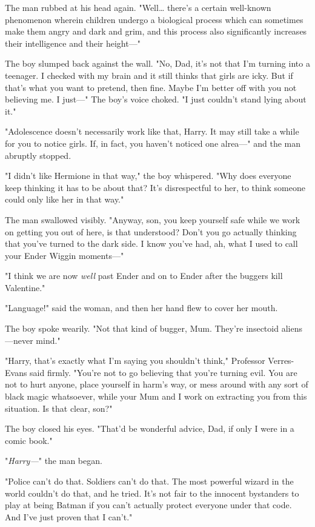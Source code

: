 The man rubbed at his head again. "Well{\ldots} there's a certain well-known
phenomenon wherein children undergo a biological process which can sometimes
make them angry and dark and grim, and this process also significantly
increases their intelligence and their height---"

The boy slumped back against the wall. "No, Dad, it's not that I'm turning into
a teenager. I checked with my brain and it still thinks that girls are icky.
But if that's what you want to pretend, then fine. Maybe I'm better off with
you not believing me. I just---" The boy's voice choked. "I just couldn't stand
lying about it."

"Adolescence doesn't necessarily work like that, Harry. It may still take a
while for you to notice girls. If, in fact, you haven't noticed one alrea---" and
the man abruptly stopped.

"I didn't like Hermione in that way," the boy whispered. "Why does everyone
keep thinking it has to be about that? It's disrespectful to her, to think
someone could only like her in that way."

The man swallowed visibly. "Anyway, son, you keep yourself safe while we work
on getting you out of here, is that understood? Don't you go actually thinking
that you've turned to the dark side. I know you've had, ah, what I used to call
your Ender Wiggin moments---"

"I think we are now \emph{well} past Ender and on to Ender after the buggers
kill Valentine."

"Language!" said the woman, and then her hand flew to cover her mouth.

The boy spoke wearily. "Not that kind of bugger, Mum. They're insectoid
aliens---never mind."

"Harry, that's exactly what I'm saying you shouldn't think," Professor
Verres-Evans said firmly. "You're not to go believing that you're turning evil.
You are not to hurt anyone, place yourself in harm's way, or mess around with
any sort of black magic whatsoever, while your Mum and I work on extracting you
from this situation. Is that clear, son?"

The boy closed his eyes. "That'd be wonderful advice, Dad, if only I were in a
comic book."

"\emph{Harry---}" the man began.

"Police can't do that. Soldiers can't do that. The most powerful wizard in the
world couldn't do that, and he tried. It's not fair to the innocent bystanders
to play at being Batman if you can't actually protect everyone under that code.
And I've just proven that I can't."

